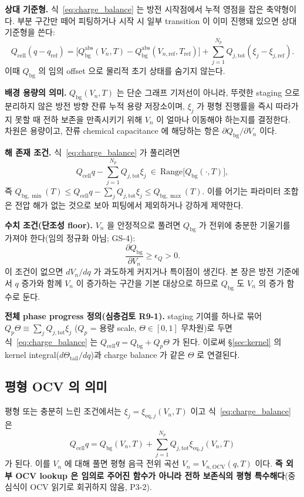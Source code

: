 \documentclass[11pt,a4paper]{article}
\newcommand{\eq}{\mathrm{eq}}
\newcommand{\tot}{\mathrm{tot}}
\newcommand{\bg}{\mathrm{bg}}
\newcommand{\cell}{\mathrm{cell}}
\newcommand{\OCV}{\mathrm{OCV}}
\begin{document}
\textbf{상대 기준형.} 식~\eqref{eq:charge_balance} 는 방전 시작점에서 누적 영점을 잡은 축약형이다.
부분 구간만 떼어 피팅하거나 시작 시 일부 transition 이 이미 진행돼 있으면 상대 기준형을 쓴다:
\begin{equation}
Q_\cell(q-q_\mathrm{ref})=\big[Q_\bg^\mathrm{abs}(V_n,T)-Q_\bg^\mathrm{abs}(V_{n,\mathrm{ref}},T_\mathrm{ref})\big]
+\sum_{j=1}^{N_p}Q_{j,\tot}(\xi_j-\xi_{j,\mathrm{ref}}).
\label{eq:charge_balance_rel}
\end{equation}
이때 $Q_\bg$ 의 임의 offset 으로 물리적 초기 상태를 숨기지 않는다.

\textbf{배경 용량의 의미.} $Q_\bg(V_n,T)$ 는 단순 그래프 기저선이 아니라, 뚜렷한 staging 으로 분리하지
않은 방전 방향 잔류 누적 용량 저장소이며, $\xi_j$ 가 평형 진행률을 즉시 따라가지 못할 때 전하 보존을
만족시키기 위해 $V_n$ 이 얼마나 이동해야 하는지를 결정한다. 차원은 용량이고, 잔류 chemical
capacitance 에 해당하는 항은 $\partial Q_\bg/\partial V_n$ 이다.

\textbf{해 존재 조건.} 식~\eqref{eq:charge_balance} 가 풀리려면
\begin{equation}
Q_\cell q-\sum_{j=1}^{N_p}Q_{j,\tot}\xi_j\ \in\ \mathrm{Range}\big[Q_\bg(\cdot,T)\big],
\label{eq:solexist}
\end{equation}
즉 $Q_{\bg,\min}(T)\le Q_\cell q-\sum_j Q_{j,\tot}\xi_j\le Q_{\bg,\max}(T)$. 이를 어기는 파라미터
조합은 전압 해가 없는 것으로 보아 피팅에서 제외하거나 강하게 제약한다.

\textbf{수치 조건(단조성 floor).} $V_n$ 을 안정적으로 풀려면 $Q_\bg$ 가 전위에 충분한 기울기를 가져야
한다(임의 정규화 아님; GS-4):
\begin{equation}
\frac{\partial Q_\bg}{\partial V_n}\ge \epsilon_Q>0.
\label{eq:monotone}
\end{equation}
이 조건이 없으면 $dV_n/dq$ 가 과도하게 커지거나 특이점이 생긴다. 본 장은 방전 기준에서 $q$ 증가와
함께 $V_n$ 이 증가하는 구간을 기본 대상으로 하므로 $Q_\bg$ 도 $V_n$ 의 증가 함수로 둔다.

\textbf{전체 phase progress 정의(심층검토 R9-1).} staging 기여를 하나로 묶어
$Q_p\Theta\equiv\sum_j Q_{j,\tot}\xi_j$ ($Q_p$ = 용량 scale, $\Theta\in[0,1]$ 무차원)로 두면
식~\eqref{eq:charge_balance} 는 $Q_\cell q=Q_\bg+Q_p\Theta$ 가 된다. 이로써 \S\ref{sec:kernel} 의
kernel integral($d\Theta_\mathrm{tail}/dq$)과 charge balance 가 같은 $\Theta$ 로 연결된다.

\subsection{평형 OCV 의 의미}\label{sec:ocv}
평형 또는 충분히 느린 조건에서는 $\xi_j=\xi_{\eq,j}(V_n,T)$ 이고 식~\eqref{eq:charge_balance} 은
\begin{equation}
Q_\cell q=Q_\bg(V_n,T)+\sum_{j=1}^{N_p}Q_{j,\tot}\xi_{\eq,j}(V_n,T)
\label{eq:ocv_implicit}
\end{equation}
가 된다. 이를 $V_n$ 에 대해 풀면 평형 음극 전위 곡선 $V_n=V_{n,\OCV}(q,T)$ 이다. \textbf{즉 외부 OCV
lookup 은 임의로 주어진 함수가 아니라 전하 보존식의 평형 특수해다}(중심식이 OCV 읽기로 회귀하지 않음, P3-2).
\end{document}
